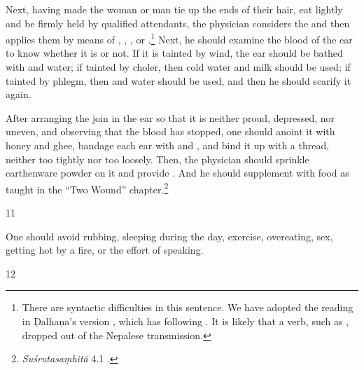 \begin{translation}
Next, having made the woman or man tie up the ends of their hair, eat lightly and
be firmly held by qualified attendants, the physician considers the
 and then applies them by means of 
,
, , or
.\footnote{There are syntactic difficulties in this
    sentence.  We have %
    adopted the reading in Ḍalhaṇa's version \citep[78]{vulgate}, which has
     following . It is likely that a verb, such
    as , dropped out of the Nepalese transmission.}  Next, he should
    examine the blood of the ear to know whether it is  or not.
    If it is tainted by wind, the ear should be bathed with
     and water; if tainted by choler, then
    cold water and milk should be used; if tainted by phlegm, then
     and water should be used, and then he 
    should
    scarify it again.
       
After arranging the join in the ear so that it is neither proud, depressed, nor
uneven, and observing that the blood has stopped, one should anoint it with
honey and ghee, bandage each ear with  and 
, and
bind it up with a thread, neither too tightly nor too loosely.  Then, the
physician should sprinkle earthenware powder on it and  provide
. And he should supplement with food as taught in  the
“Two Wound” chapter.\footnote{\emph{Suśrutasaṃhitā} 4.1 \citep[396–408]{vulgate}.}
    
    \smallskip
\item[11]
\begin{em}
        One should avoid rubbing, sleeping during the day, exercise, overeating,
        sex, getting hot by a fire, or the effort of speaking.
    \end{em}
\smallskip

\item[12]
    

\end{translation}
